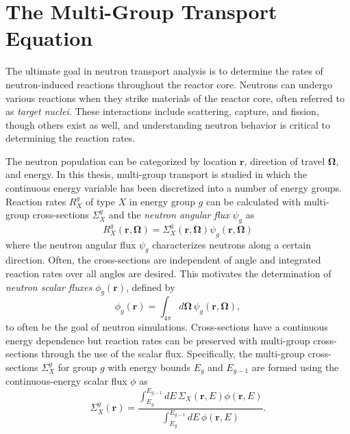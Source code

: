 \section{The Multi-Group Transport Equation}
\label{sec:multi-group-transport}

The ultimate goal in neutron transport analysis is to determine the rates of neutron-induced reactions throughout the reactor core. Neutrons can undergo various reactions when they strike materials of the reactor core, often referred to as \textit{target nuclei}. These interactions include scattering, capture, and fission, though others exist as well, and understanding neutron behavior is critical to determining the reaction rates.

The neutron population can be categorized by location $\mathbf{r}$, direction of travel $\mathbf{\Omega}$, and energy. In this thesis, multi-group transport is studied in which the continuous energy variable has been discretized into a number of energy groups. Reaction rates $R_X^g$ of type $X$ in energy group $g$ can be calculated with multi-group cross-sections $\Sigma_X^g$ and the \textit{neutron angular flux} $\psi_{g}$ as
\begin{equation}
R_X^g(\mathbf{r}, \mathbf{\Omega}) = \Sigma_X^g(\mathbf{r}, \mathbf{\Omega}) \psi_{g}(\mathbf{r},\mathbf{\Omega})
\end{equation}
where the neutron angular flux $\psi_{g}$ characterizes neutrons along a certain direction.  Often, the cross-sections are independent of angle and integrated reaction rates over all angles are desired. This motivates the determination of \textit{neutron scalar fluxes} $\phi_g(\mathbf{r})$, defined by
\begin{equation}
\phi_{g}(\mathbf{r}) = \int_{4\pi} d\mathbf{\Omega} \, \psi_{g}(\mathbf{r},\mathbf{\Omega}),
\label{eqn:scalar-flux}
\end{equation}
to often be the goal of neutron simulations. Cross-sections have a continuous energy dependence but reaction rates can be preserved with multi-group cross-sections through the use of the scalar flux. Specifically, the multi-group cross-sections $\Sigma_X^g$ for group $g$ with energy bounds $E_g$ and $E_{g-1}$ are formed using the continuous-energy scalar flux $\phi$ as
\begin{equation}
\Sigma_{X}^g(\mathbf{r}) = \frac{\int_{E_{g}}^{E_{g-1}} dE \, \Sigma_{X}(\mathbf{r},E)\phi(\mathbf{r},E)}{\int_{E_{g}}^{E_{g-1}} dE \, \phi(\mathbf{r},E)}.
\label{eqn:mgxs}
\end{equation}
